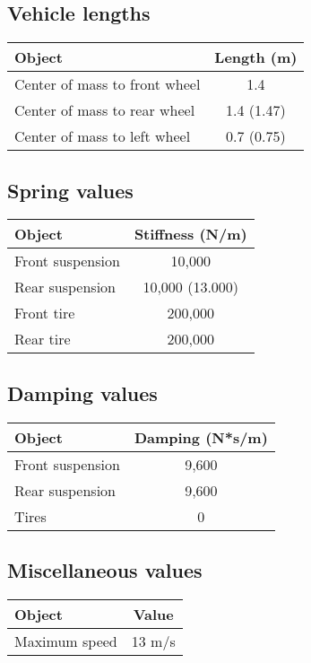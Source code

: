 \subsection{Vehicle lengths}
\begin{center}
\begin{tabular}{| l | c |}
\hline
Object & Length (m) \\
\hline
Center of mass to front wheel & 1.4 \\
Center of mass to rear wheel & 1.4 (1.47) \\
Center of mass to left wheel & 0.7 (0.75) \\
\hline
\end{tabular}
\end{center}

\subsection{Spring values}
\begin{center}
\begin{tabular}{| l | c |}
\hline
Object & Stiffness (N/m) \\
\hline
Front suspension & 10,000 \\
Rear suspension & 10,000 (13.000) \\
Front tire & 200,000 \\
Rear tire & 200,000 \\
\hline
\end{tabular}
\end{center}

\subsection{Damping values}
\begin{center}
\begin{tabular}{| l | c |}
\hline
Object & Damping (N*s/m) \\
\hline
Front suspension & 9,600 \\
Rear suspension & 9,600 \\
Tires & 0 \\
\hline
\end{tabular}
\end{center}


\subsection{Miscellaneous values}
\begin{center}
\begin{tabular}{| l | c |}
\hline
Object & Value \\
\hline
Maximum speed & 13 m/s \\
\hline
\end{tabular}
\end{center}

